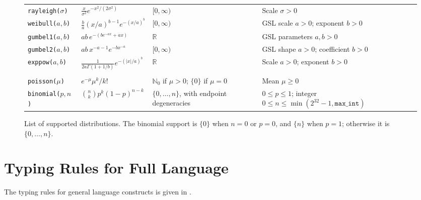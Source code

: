 \begin{figure}[t]
\begin{tabularx}{\textwidth}{@{}>{\raggedright\arraybackslash}p{} >{\raggedright\arraybackslash}p{} >{\raggedright\arraybackslash}p{} >{\raggedright\arraybackslash}p{}@{}}
    \texttt{rayleigh($\sigma$)} & $\frac{x}{\sigma^2}e^{-x^2/(2\sigma^2)}$ & $[0,\infty)$ & Scale $\sigma>0$ \\
    \texttt{weibull($a,b$)} & $\frac{b}{a}(x/a)^{b-1}e^{-(x/a)^b}$ & $[0,\infty)$ & GSL scale $a>0$; exponent $b>0$ \\
    \texttt{gumbel1($a,b$)} & $a b\,e^{-(b e^{-a x}+a x)}$ & $\mathbb R$ & GSL parameters $a,b>0$ \\
    \texttt{gumbel2($a,b$)} & $a b\,x^{-a-1}e^{-b x^{-a}}$ & $[0,\infty)$ & GSL shape $a>0$; coefficient $b>0$ \\
    \texttt{exppow($a,b$)} & $\frac{1}{2a\Gamma(1+1/b)}e^{-(|x|/a)^b}$ & $\mathbb R$ & Scale $a>0$; exponent $b>0$ \\
    \midrule
    \multicolumn{4}{@{}l}{\textit{Discrete distributions}} \\
    \addlinespace[2pt]
    \texttt{poisson($\mu$)} & $e^{-\mu}\mu^k/k!$ & $\mathbb N_0$ if $\mu>0$; $\{0\}$ if $\mu=0$ & Mean $\mu\geq0$ \\
    \texttt{binomial($p,n$)} & $\binom nk p^k(1-p)^{n-k}$ & $\{0,\ldots,n\}$, with endpoint degeneracies & $0\leq p\leq1$; integer $0\leq n\leq\min(2^{32}-1,\texttt{max\_int})$ \\
    \bottomrule
\end{tabularx}
\caption{List of supported distributions.
The binomial support is $\{0\}$ when $n=0$ or $p=0$, and $\{n\}$ when
$p=1$; otherwise it is $\{0,\ldots,n\}$.}
\label{fig:implemented-distribution-laws}
\end{figure}

    
    
\section{Typing Rules for Full \Slicebf{} Language}\label{appen:typing-rules}

The typing rules for general language constructs is given in .




